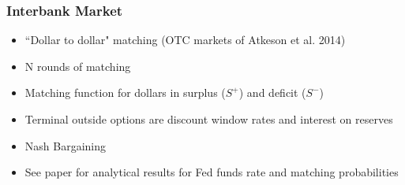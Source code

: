 \documentclass[10pt]{beamer}
\begin{document}
\begin{frame}
\frametitle{Interbank Market}
\begin{itemize}
  \setlength{\itemsep}{14pt}
\item ``Dollar to dollar"  matching (OTC markets of Atkeson et al. 2014)
\item N rounds of matching
\item Matching function for dollars in surplus ($S^+$) and deficit ($S^-$)
\item Terminal outside options are discount window rates and interest on reserves %
\item Nash Bargaining
\item See paper for analytical results for Fed funds rate and matching probabilities

%
\end{itemize}
\end{frame}
\end{document}
